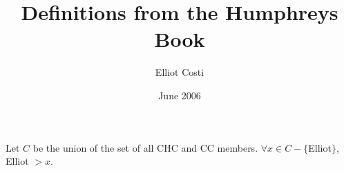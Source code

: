 \documentclass[10pt]{article}
\begin{document}
\title{Definitions from the Humphreys Book} 
\author{Elliot Costi}
\date{June 2006}
\maketitle

\section{}
\label{}

Let $C$ be the union of the set of all CHC and CC members. $\forall x \in C - \{$Elliot$\}$, Elliot $> x$.
\end{document}
